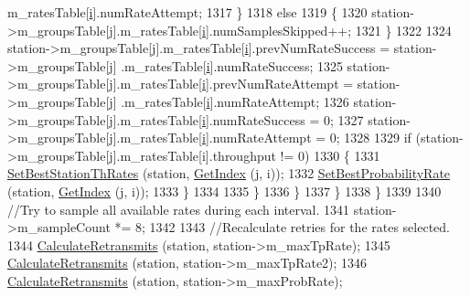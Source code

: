\begin{DoxyCode}
      m\_ratesTable[\hyperlink{bernuolliDistribution_8m_a6f6ccfcf58b31cb6412107d9d5281426}{i}].numRateAttempt;
1317                     \}
1318                   \textcolor{keywordflow}{else}
1319                     \{
1320                       station->m\_groupsTable[j].m\_ratesTable[\hyperlink{bernuolliDistribution_8m_a6f6ccfcf58b31cb6412107d9d5281426}{i}].numSamplesSkipped++;
1321                     \}
1322 
1324                   station->m\_groupsTable[j].m\_ratesTable[\hyperlink{bernuolliDistribution_8m_a6f6ccfcf58b31cb6412107d9d5281426}{i}].prevNumRateSuccess = station->m\_groupsTable[j]
      .m\_ratesTable[\hyperlink{bernuolliDistribution_8m_a6f6ccfcf58b31cb6412107d9d5281426}{i}].numRateSuccess;
1325                   station->m\_groupsTable[j].m\_ratesTable[\hyperlink{bernuolliDistribution_8m_a6f6ccfcf58b31cb6412107d9d5281426}{i}].prevNumRateAttempt = station->m\_groupsTable[j]
      .m\_ratesTable[\hyperlink{bernuolliDistribution_8m_a6f6ccfcf58b31cb6412107d9d5281426}{i}].numRateAttempt;
1326                   station->m\_groupsTable[j].m\_ratesTable[\hyperlink{bernuolliDistribution_8m_a6f6ccfcf58b31cb6412107d9d5281426}{i}].numRateSuccess = 0;
1327                   station->m\_groupsTable[j].m\_ratesTable[\hyperlink{bernuolliDistribution_8m_a6f6ccfcf58b31cb6412107d9d5281426}{i}].numRateAttempt = 0;
1328 
1329                   \textcolor{keywordflow}{if} (station->m\_groupsTable[j].m\_ratesTable[i].throughput != 0)
1330                     \{
1331                       \hyperlink{classns3_1_1MinstrelHtWifiManager_a5c8fb23ad34518c1e1f2add75a3b7f4c}{SetBestStationThRates} (station, 
      \hyperlink{classns3_1_1MinstrelHtWifiManager_ac67b182c22710c919c3dd4de337aca79}{GetIndex} (j, i));
1332                       \hyperlink{classns3_1_1MinstrelHtWifiManager_ac9995672834a1256d4203b6045f6b513}{SetBestProbabilityRate} (station, 
      \hyperlink{classns3_1_1MinstrelHtWifiManager_ac67b182c22710c919c3dd4de337aca79}{GetIndex} (j, i));
1333                     \}
1334 
1335                 \}
1336             \}
1337         \}
1338     \}
1339 
1340   \textcolor{comment}{//Try to sample all available rates during each interval.}
1341   station->m\_sampleCount *= 8;
1342 
1343   \textcolor{comment}{//Recalculate retries for the rates selected.}
1344   \hyperlink{classns3_1_1MinstrelHtWifiManager_a01ece0b82fd4cefb27de6a8759bc9529}{CalculateRetransmits} (station, station->m\_maxTpRate);
1345   \hyperlink{classns3_1_1MinstrelHtWifiManager_a01ece0b82fd4cefb27de6a8759bc9529}{CalculateRetransmits} (station, station->m\_maxTpRate2);
1346   \hyperlink{classns3_1_1MinstrelHtWifiManager_a01ece0b82fd4cefb27de6a8759bc9529}{CalculateRetransmits} (station, station->m\_maxProbRate);

\end{DoxyCode}
